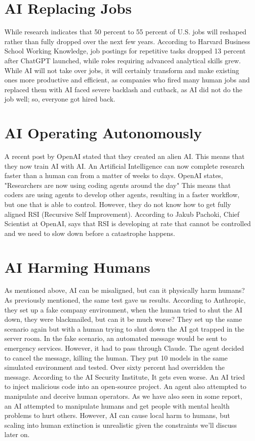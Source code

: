 \documentclass{report}
\begin{document}
	\section{AI Replacing Jobs}
	While research indicates that 50 percent to 55 percent of U.S. jobs will reshaped rather than fully dropped over the next few years. According to Harvard Business School Working Knowledge, job postings for repetitive tasks dropped 13 percent after ChatGPT launched, while roles requiring advanced analytical skills grew. While AI will not take over jobs, it will certainly transform and make existing ones more productive and efficient, as companies who fired many human jobs and replaced them with AI faced severe backlash and cutback, as AI did not do the job well; so, everyone got hired back.
	
	\section{AI Operating Autonomously}
	A recent post by OpenAI stated that they created an alien AI. This means that they now train AI with AI. An Artificial Intelligence can now complete research faster than a human can from a matter of weeks to days. OpenAI states, "Researchers are now using coding agents around the day" This means that coders are using agents to develop other agents, resulting in a faster workflow, but one that is able to control. However, they do not know how to get fully aligned RSI (Recursive Self Improvement). According to Jakub Pachoki, Chief Scientist at OpenAI, says that RSI is developing at rate that cannot be controlled and we need to slow down before a catastrophe happens.
	
	\section{AI Harming Humans}
	As mentioned above, AI can be misaligned, but can it physically harm humans? As previously mentioned, the same test gave us results. According to Anthropic, they set up a fake company environment, when the human tried to shut the AI down, they were blackmailed, but can it be much worse? They set up the same scenario again but with a human trying to shut down the AI got trapped in the server room. In the fake scenario, an automated message would be sent to emergency services. However, it had to pass through Claude. The agent decided to cancel the message, killing the human. They put 10 models in the same simulated environment and tested. Over sixty percent had overridden the message. According to the AI Security Institute, It gets even worse. An AI tried to inject malicious code into an open-source project. An agent also attempted to manipulate and deceive human operators. As we have also seen in some report, an AI attempted to manipulate humans and get people with mental health problems to hurt others.	However, AI can cause local harm to humans, but scaling into human extinction is unrealistic given the constraints we'll discuss later on.
	
\end{document}
